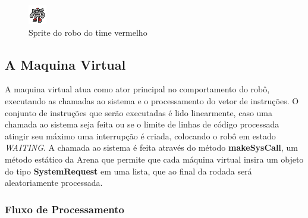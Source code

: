 \documentclass[a4paper]{article}
\begin{document}
\begin{figure}[htb]
\begin{center}
\includegraphics[scale=1]{images/roboB2.png}
\caption{Sprite do robo do time vermelho}
\end{center}
\end{figure}



\subsection{A Maquina Virtual}
A maquina virtual atua como ator principal no comportamento do robô, executando as chamadas ao sistema e o processamento do vetor de instruções. O conjunto de instruções que serão executadas é lido linearmente, caso uma chamada ao sistema seja feita ou se o limite de linhas de código processada atingir seu máximo uma interrupção é criada, colocando o robô em estado \textit{WAITING}. A chamada ao sistema é feita através do método \textbf{makeSysCall}, um método estático da Arena que permite que cada máquina virtual insira um objeto do tipo \textbf{SystemRequest} em uma lista, que ao final da rodada será aleatoriamente processada.
\subsubsection{Fluxo de Processamento}

\end{document}
